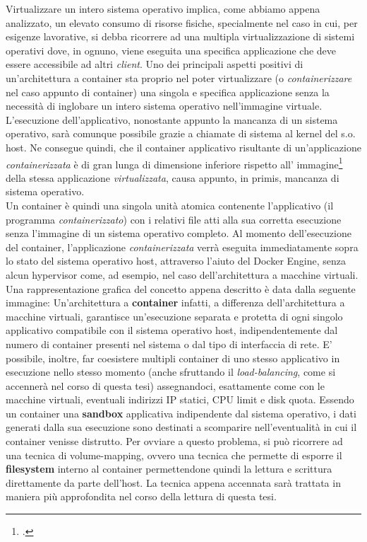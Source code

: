 Virtualizzare un intero sistema operativo implica, come abbiamo appena analizzato, un elevato consumo di risorse fisiche, specialmente nel caso in cui, per esigenze lavorative, si debba ricorrere ad una multipla virtualizzazione di sistemi operativi dove, in ognuno, viene eseguita una specifica applicazione che deve essere accessibile ad altri \textit{client}.
Uno dei principali aspetti positivi di un'architettura a container sta proprio nel poter virtualizzare (o \textit{containerizzare} nel caso appunto di container) una singola e specifica applicazione senza la necessità di inglobare un intero sistema operativo nell'immagine virtuale. L'esecuzione dell'applicativo, nonostante appunto la mancanza di un sistema operativo, sarà comunque possibile grazie a chiamate di sistema al kernel del s.o. host. Ne consegue quindi, che il container applicativo risultante di un'applicazione \textit{containerizzata} è di gran lunga di dimensione inferiore rispetto all' immagine\footcite{inteso come dimensione in Gb del virtual disk image (*.vdi) dell'immagine virtualizzata} della stessa applicazione \textit{virtualizzata}, causa appunto, in primis, mancanza di sistema operativo.\\
Un container è quindi una singola unità atomica contenente l'applicativo (il programma \textit{containerizzato}) con i relativi file atti alla sua corretta esecuzione senza l'immagine di un sistema operativo completo.
Al momento dell'esecuzione del container, l'applicazione \textit{containerizzata} verrà eseguita immediatamente sopra lo stato del sistema operativo host, attraverso l'aiuto del Docker Engine, senza alcun hypervisor come, ad esempio, nel caso dell'architettura a macchine virtuali. Una rappresentazione grafica del concetto appena descritto è data dalla seguente immagine:
Un'architettura a \textbf{container} infatti, a differenza dell'architettura a macchine virtuali, garantisce un'esecuzione separata e protetta di ogni singolo applicativo compatibile con il sistema operativo host, indipendentemente dal numero di container presenti nel sistema o dal tipo di interfaccia di rete. E' possibile, inoltre, far coesistere multipli container di uno stesso applicativo in esecuzione nello stesso momento (anche sfruttando il \textit{load-balancing}, come si accennerà nel corso di questa tesi) assegnandoci, esattamente come con le macchine virtuali, eventuali indirizzi IP statici, CPU limit e disk quota.
Essendo un container una \textbf{\gls{sandbox}} applicativa indipendente dal sistema operativo, i dati generati dalla sua esecuzione sono destinati a scomparire nell'eventualità in cui il container venisse distrutto. Per ovviare a questo problema, si può ricorrere ad una tecnica di volume-mapping, ovvero una tecnica che permette di esporre il \textbf{\gls{filesystem}} interno al container permettendone quindi la lettura e scrittura direttamente da parte dell'host. La tecnica appena accennata sarà trattata in maniera più approfondita nel corso della lettura di questa tesi.
